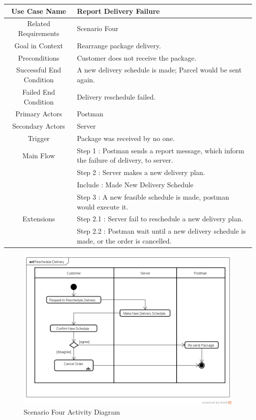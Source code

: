 \documentclass[12pt]{scrreprt}
\begin{document}
\begin{table}
  \centering
  \begin{tabular}{| c | p{11cm} |}
    \hline
    Use Case Name & Report Delivery Failure\\
    \hline
    Related Requirements & Scenario Four\\
    \hline
    Goal in Context & Rearrange package delivery.\\
    \hline
    Preconditions & Customer does not receive the package.\\
    \hline
    Successful End Condition & A new delivery schedule is made; Parcel would
    be sent again.\\
    \hline
    Failed End Condition & Delivery reschedule failed.\\
    \hline
    Primary Actors & Postman\\
    \hline
    Secondary Actors & Server\\
    \hline
    Trigger & Package was received by no one.\\
    \hline
    Main Flow & Step 1 : Postman sends a report message, which inform the
    failure of delivery, to server.\\
    & Step 2 : Server makes a new delivery plan.\\
    & Include : Made New Delivery Schedule\\
    & Step 3 : A new feasible schedule is made, postman would execute it.\\
    \hline
    Extensions & Step 2.1 : Server fail to reschedule a new delivery plan.\\
    & Step 2.2 : Postman wait until a new delivery schedule is made, or the
    order is cancelled.\\
    \hline
  \end{tabular}
\end{table}

\begin{figure}[H]
  \centering\includegraphics[width=6in]{DocumentRes/4RescheduleDelivery.png}
  \caption{Scenario Four Activity Diagram}
\end{figure}
\end{document}
